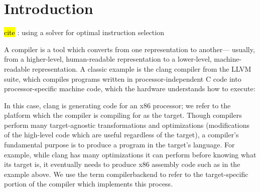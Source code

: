 \chapter{Introduction}

\hl{cite} \cite{ebner2008generalized}: using a solver for optimal instruction selection

A \gls{compiler}
  is a tool which
  converts from one representation
  to another---%
  usually, from a
  higher-level,
  human-readable representation
  to a lower-level,
  machine-readable representation.
A classic example
  is the clang compiler
  from the LLVM suite,
  which
  compiles programs written in 
  processor-independent C code
  into processor-specific
  machine code,
  which the hardware understands how
  to execute:
\begin{figure}[!h]
\centering
{}
\end{figure}

\noindent
In this case,
  clang is generating code 
  for an x86 processor;
  we refer to 
  the platform
  which the compiler is compiling for
  as the \gls{target}.
Though compilers perform many target-agnostic
  transformations and optimizations
  (modifications of the high-level code
    which are useful regardless of the target),
  a compiler's fundamental purpose
  is to produce a program
  in the target's language.
For example,
  while clang has many optimizations
  it can perform
  before knowing what its target is,
  it eventually needs to produce x86
  assembly code
  such as in the example above.
We use the term
  \gls{compilerbackend}
  to refer to the target-specific portion
  of the compiler
  which implements this process.

